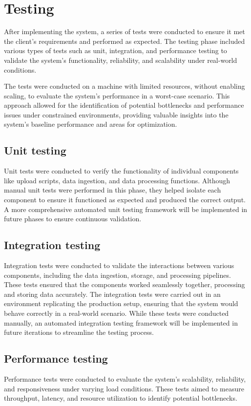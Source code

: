 \chapter{Testing}
\label{cap:testing}

After implementing the system, a series of tests were conducted to ensure it met the client’s requirements and performed as expected. The testing phase included various types of tests such as unit, integration, and performance testing to validate the system’s functionality, reliability, and scalability under real-world conditions.

The tests were conducted on a machine with limited resources, without enabling scaling, to evaluate the system’s performance in a worst-case scenario. This approach allowed for the identification of potential bottlenecks and performance issues under constrained environments, providing valuable insights into the system's baseline performance and areas for optimization.

\section{Unit testing}
Unit tests were conducted to verify the functionality of individual components like upload scripts, data ingestion, and data processing functions. Although manual unit tests were performed in this phase, they helped isolate each component to ensure it functioned as expected and produced the correct output. A more comprehensive automated unit testing framework will be implemented in future phases to ensure continuous validation.

\section{Integration testing}
Integration tests were conducted to validate the interactions between various components, including the data ingestion, storage, and processing pipelines. These tests ensured that the components worked seamlessly together, processing and storing data accurately. The integration tests were carried out in an environment replicating the production setup, ensuring that the system would behave correctly in a real-world scenario. While these tests were conducted manually, an automated integration testing framework will be implemented in future iterations to streamline the testing process.

\section{Performance testing}
Performance tests were conducted to evaluate the system’s scalability, reliability, and responsiveness under varying load conditions. These tests aimed to measure throughput, latency, and resource utilization to identify potential bottlenecks. 

